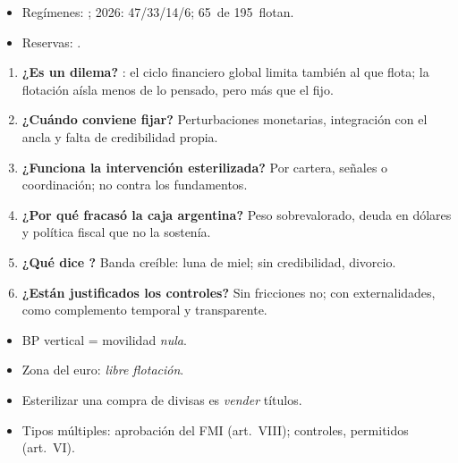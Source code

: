 \documentclass{article}
\begin{document}
\begin{columnas}
\anexorepaso
{}
\begin{itemize}
\item Regímenes: ; 2026: 47/33/14/6; 65~de 195~flotan.
\item Reservas: .
\end{itemize}
\begin{enumerate}
\item \textbf{¿Es un dilema?} : el ciclo financiero global limita también al que flota; la flotación aísla menos de lo pensado, pero más que el fijo.
\item \textbf{¿Cuándo conviene fijar?} Perturbaciones monetarias, integración con el ancla y falta de credibilidad propia.
\item \textbf{¿Funciona la intervención esterilizada?} Por cartera, señales o coordinación; no contra los fundamentos.
\item \textbf{¿Por qué fracasó la caja argentina?} Peso sobrevalorado, deuda en dólares y política fiscal que no la sostenía.
\item \textbf{¿Qué dice ?} Banda creíble: luna de miel; sin credibilidad, divorcio.
\item \textbf{¿Están justificados los controles?} Sin fricciones no; con externalidades, como complemento temporal y transparente.
\end{enumerate}
\begin{trampa}
\begin{itemize}
\item BP vertical = movilidad \emph{nula}.
\item Zona del euro: \emph{libre flotación}.
\item Esterilizar una compra de divisas es \emph{vender} títulos.
\item Tipos múltiples: aprobación del FMI (art.\ VIII); controles, permitidos (art.\ VI).
\end{itemize}
\end{trampa}

\end{columnas}
\end{document}

